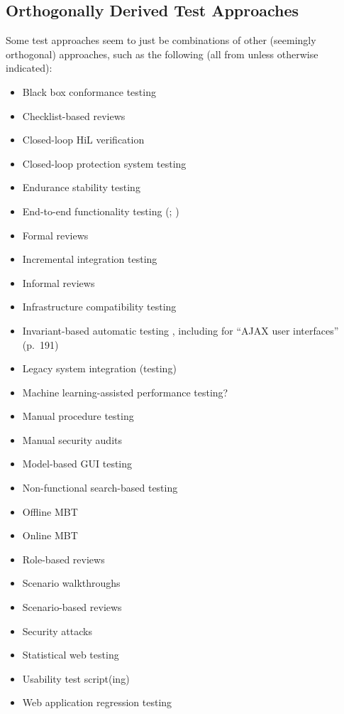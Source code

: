 \subsection{Orthogonally Derived Test Approaches}
\label{chap:testing:sec:orthogonal-tests}
Some test approaches seem to just be combinations of other (seemingly
orthogonal) approaches, such as the following (all from
\citepISTQB{} unless otherwise indicated):
\begin{itemize}
      \item Black box conformance testing \citep[p.~25]{JardEtAl1999}
      \item Checklist-based reviews
      \item Closed-loop HiL verification \citep[p.~6]{PreußeEtAl2012}
      \item Closed-loop protection system testing \citep[p.~331]{ForsythEtAl2004}
      \item Endurance stability testing \citep[p.~55]{Firesmith2015}
      \item End-to-end functionality testing (\citealp[p.~20]{IEEE2021};
            \citealp[Tab.~2]{Gerrard2000a})
      \item Formal reviews
      \item Incremental integration testing \citep[p.~601]{SharmaEtAl2021}
      \item Informal reviews
      \item Infrastructure compatibility testing \citep[p.~53]{Firesmith2015}
      \item Invariant-based automatic testing
            \citep[pp.~184-185,~Tab.~21]{DoğanEtAl2014}, including for
            ``AJAX user interfaces'' (p.~191)
      \item Legacy system integration (testing) \citep[Tab.~2]{Gerrard2000a}
      \item Machine learning-assisted performance testing? \citep{Moghadam2019}
      \item Manual procedure testing \citep[p.~47]{Firesmith2015}
      \item Manual security audits \citep[p.~28]{Gerrard2000b}
      \item Model-based GUI testing \citep[Tab.~1]{DoğanEtAl2014}
      \item Non-functional search-based testing \citep[Tab.~1]{DoğanEtAl2014}
      \item Offline MBT
      \item Online MBT
      \item Role-based reviews
      \item Scenario walkthroughs \citep[Fig.~4]{Gerrard2000a}
      \item Scenario-based reviews
      \item Security attacks
      \item Statistical web testing \citep[p.~185]{DoğanEtAl2014}
      \item Usability test script(ing)
      \item Web application regression testing \cite[Tab.~21]{DoğanEtAl2014}
\end{itemize}

